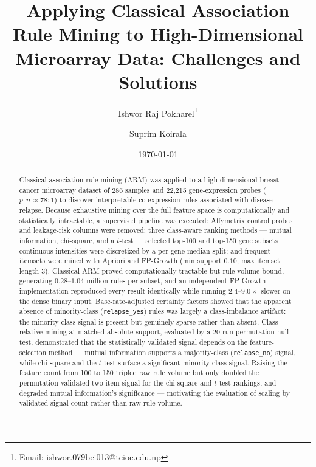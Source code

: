 \documentclass[twocolumn]{article}
\title{Applying Classical Association Rule Mining to High-Dimensional Microarray Data: Challenges and Solutions}
\author{
    Ishwor Raj Pokharel\thanks{Email: ishwor.079bei013@tcioe.edu.np} 
    \and 
    Suprim Koirala
}
\date{\today}
\begin{document}
\maketitle

\begin{abstract}
Classical association rule mining (ARM) was applied to a high-dimensional
breast-cancer microarray dataset of 286 samples and 22{,}215 gene-expression
probes ($p{:}n \approx 78{:}1$) to discover interpretable co-expression rules
associated with disease relapse. Because exhaustive mining over the full
feature space is computationally and statistically intractable, a supervised
pipeline was executed: Affymetrix control probes and leakage-risk columns were
removed; three class-aware ranking methods --- mutual information,
chi-square, and a $t$-test --- selected top-100 and top-150 gene subsets
continuous intensities were discretized by a per-gene median split; and
frequent itemsets were mined with Apriori and FP-Growth (min support $0.10$,
max itemset length 3). Classical ARM proved computationally tractable but
rule-volume-bound, generating $0.28$--$1.04$ million rules per subset, and an
independent FP-Growth implementation reproduced every result identically while
running $2.4$--$9.0\times$ slower on the dense binary input. Base-rate-adjusted
certainty factors showed that the apparent absence of minority-class
(\texttt{relapse\_yes}) rules was largely a class-imbalance artifact: the
minority-class signal is present but genuinely sparse rather than absent.
Class-relative mining at matched absolute support, evaluated by a 20-run
permutation null test, demonstrated that the statistically validated signal
depends on the feature-selection method --- mutual information supports a
majority-class (\texttt{relapse\_no}) signal, while chi-square and the
$t$-test surface a significant minority-class signal. Raising the feature
count from 100 to 150 tripled raw rule volume but only doubled the
permutation-validated two-item signal for the chi-square and $t$-test
rankings, and degraded mutual information's significance --- motivating the
evaluation of scaling by validated-signal count rather than raw rule volume.
\end{abstract}
\end{document}
